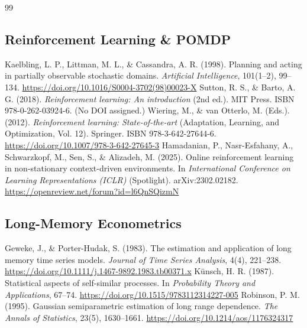 \documentclass[11pt]{article}
\begin{document}
\begin{thebibliography}{99}
\subsection{Reinforcement Learning \& POMDP}
 Kaelbling, L. P., Littman, M. L., \& Cassandra, A. R. (1998). Planning and acting in partially observable stochastic domains. \textit{Artificial Intelligence}, 101(1--2), 99--134. \url{https://doi.org/10.1016/S0004-3702(98)00023-X}
 Sutton, R. S., \& Barto, A. G. (2018). \textit{Reinforcement learning: An introduction} (2nd ed.). MIT Press. ISBN 978-0-262-03924-6. (No DOI assigned.)
 Wiering, M., \& van Otterlo, M. (Eds.). (2012). \textit{Reinforcement learning: State-of-the-art} (Adaptation, Learning, and Optimization, Vol. 12). Springer. ISBN 978-3-642-27644-6. \url{https://doi.org/10.1007/978-3-642-27645-3}
 Hamadanian, P., Nasr-Esfahany, A., Schwarzkopf, M., Sen, S., \& Alizadeh, M. (2025). Online reinforcement learning in non-stationary context-driven environments. In \textit{International Conference on Learning Representations (ICLR)} (Spotlight). arXiv:2302.02182. \url{https://openreview.net/forum?id=l6QnSQizmN}
\subsection{Long-Memory Econometrics}
 Geweke, J., \& Porter-Hudak, S. (1983). The estimation and application of long memory time series models. \textit{Journal of Time Series Analysis}, 4(4), 221--238. \url{https://doi.org/10.1111/j.1467-9892.1983.tb00371.x}
 Künsch, H. R. (1987). Statistical aspects of self-similar processes. In \textit{Probability Theory and Applications}, 67--74. \url{https://doi.org/10.1515/9783112314227-005}
 Robinson, P. M. (1995). Gaussian semiparametric estimation of long range dependence. \textit{The Annals of Statistics}, 23(5), 1630--1661. \url{https://doi.org/10.1214/aos/1176324317}
\end{thebibliography}
\end{document}
